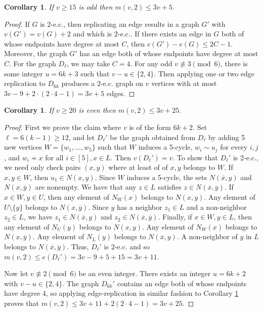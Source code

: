 \documentclass{article}
\newcommand\sm{\setminus}
\newtheorem{cor}[thm]{Corollary}
\theoremstyle{definition}
\begin{document}
\begin{cor} \label{Corollary Odd v}
    If $v\ge 15$ is odd then $m(v,2)\le 3v+5.$
\end{cor}
\begin{proof}
    If $G$ is $2$-e.c., then replicating an edge results in a graph $G'$ with $v(G')=v(G)+2$ and which is $2$-e.c.. If there exists an edge in $G$ both of whose endpoints have degree at most $C$, then $e(G')-e(G)\le 2C-1$. Moreover, the graph $G'$ has an edge both of whose endpoints have degree at most $C$. For the graph $D_\ell$, we may take $C=4$. For any odd $v\not\equiv3\pmod 6$, there is some integer $u=6k+3$ such that $v-u\in\{2,4\}.$ Then applying one or two edge replication to $D_{6k}$ produces a $2$-e.c. graph on $v$ vertices with at most $3v-9+2\cdot(2\cdot 4-1)=3v+5$ edges.
\end{proof}

\begin{cor} \label{Corollary Even v}
    If $v\ge 20$ is even then $m(v,2)\le 3v+25$.
\end{cor}
\begin{proof}
    First we prove the claim where $v$ is of the form $6k+2$. Set $\ell=6(k-1)\ge 12$, and let $D_\ell'$ be the graph obtained from $D_\ell$ by adding 5 new vertices $W=\{w_1,\ldots,w_5\}$ such that $W$ induces a 5-cycle, $w_i\sim u_j$ for every $i,j$, and $w_i\not\sim x$ for all $i\in[5],x\in L$. Then $v(D_\ell')=v$. To show that $D_\ell'$ is 2-e.c., we need only check pairs $(x,y)$ where at least of of $x,y$ belongs to $W$. If $x,y\in W$, then $u_1\in N(x,y)$. Since $W$ induces a 5-cycle, the sets $N(\overline x,y)$ and $N(x,\overline y)$ are nonempty. We have that any $z\in L$ satisfies $z\in N(\overline x,\overline y)$. If $x\in W,y\in U$, then any element of $N_W(x)$ belongs to $N(x,y)$. Any element of $U\sm\{y\}$ belongs to $N(x,\overline y)$. Since $y$ has a neighbor $z_1\in L$ and a non-neighbor $z_2\in L$, we have $z_1\in N(\overline x,y)$ and $z_2\in N(\overline x,\overline y)$. Finally, if $x\in W,y\in L$, then any element of $N_U(y)$ belongs to $N(x,y)$. Any element of $N_W(x)$ belongs to $N(x,\overline y)$. Any element of $N_L(y)$ belongs to $N(\overline x,y)$. A non-neighbor of $y$ in $L$ belongs to $N(\overline x,\overline y)$. Thus, $D_\ell'$ is 2-e.c. and so $m(v,2)\le e(D_\ell')=3v-9+5+15=3v+11.$

    Now let $v\not\equiv 2\pmod 6$ be an even integer. There exists an integer $u=6k+2$ with $v-u\in\{2,4\}$. The graph $D_{6k}'$ contains an edge both of whose endpoints have degree 4, so applying edge-replication in similar fashion to Corollary \ref{Corollary Odd v} proves that $m(v,2)\le 3v+11+2(2\cdot 4-1)=3v+25.$
\end{proof}
\end{document}

